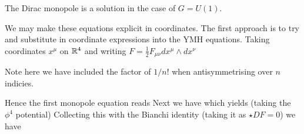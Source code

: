\documentclass{article}
\begin{document}
\begin{remark}
	The Dirac monopole is a solution in the case of $G=U(1)$.
\end{remark}
We may make these equations explicit in coordinates. The first approach is to try and substitute in coordinate expressions into the YMH equations. Taking coordinates $x^\mu$ on $\mathbb{R}^4$ and writing $F = \frac{1}{2}F_{\mu\nu} dx^\mu \wedge dx^\nu$
\begin{remark}
	Note here we have included the factor of $1/n!$ when antisymmetrising over $n$ indicies. 
\end{remark}
Hence the first monopole equation reads 
Next we have 
which yields (taking the $\phi^4$ potential)
Collecting this with the Bianchi identity (taking it as $\star DF=0$) we have 
\end{document}
